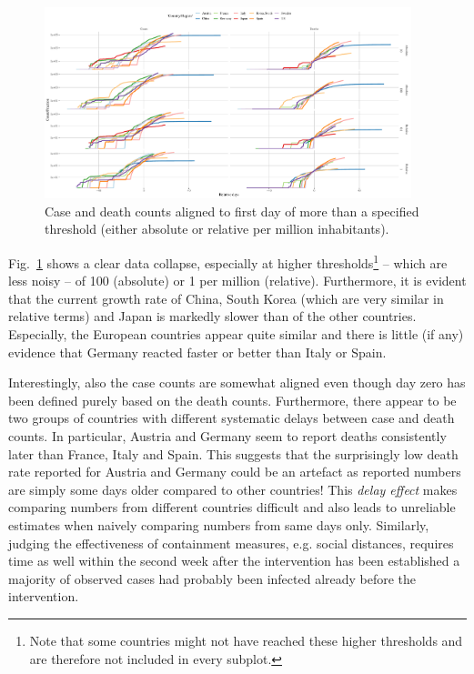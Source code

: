 \documentclass[a4paper]{tufte-handout}
\newcommand{\fig}[1]{Fig.~\ref{fig:#1}}
\begin{document}
\begin{figure}
  \begin{center}
    \includegraphics[width=0.95\textwidth]{../figs/align_data.pdf}
  \end{center}
  \caption{\label{fig:aligndata} Case and death counts aligned to
    first day of more than a specified threshold (either absolute or
    relative per million inhabitants).}
\end{figure}

\fig{aligndata} shows a clear data collapse, especially at higher
thresholds\footnote{Note that some countries might not have reached
  these higher thresholds and are therefore not included in every
  subplot.} -- which are less noisy -- of 100 (absolute) or 1 per
million (relative). Furthermore, it is evident that the current growth
rate of China, South Korea (which are very similar in relative terms)
and Japan is markedly slower than of the other countries. Especially,
the European countries appear quite similar and there is little (if
any) evidence that Germany reacted faster or better than Italy or
Spain.

Interestingly, also the case counts are somewhat aligned even though
day zero has been defined purely based on the death
counts. Furthermore, there appear to be two groups of countries with
different systematic delays between case and death counts. In
particular, Austria and Germany seem to report deaths consistently
later than France, Italy and Spain. This suggests that the
surprisingly low death rate reported for Austria and Germany could be
an artefact as reported numbers are simply some days older compared to
other countries! This {\em delay effect} makes comparing numbers from
different countries difficult and also leads to unreliable estimates
when naively comparing numbers from same days only. Similarly, judging
the effectiveness of containment measures, e.g. social distances,
requires time as well within the second week after the intervention
has been established a majority of observed cases had probably been
infected already before the intervention.
\end{document}

